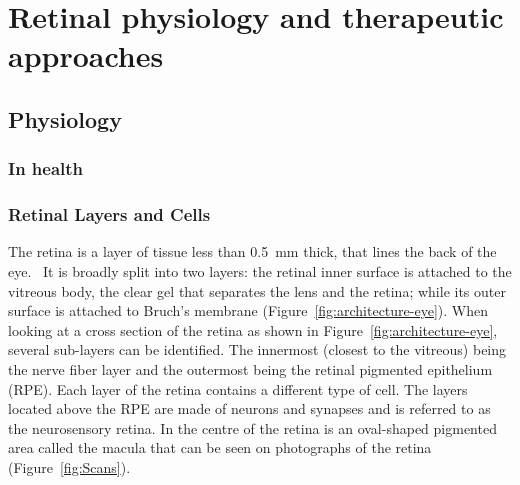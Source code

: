 \documentclass[12pt,a4paper]{journal}
\begin{document}
\section*{Retinal physiology and therapeutic approaches}

\subsection*{Physiology}

\subsubsection*{In health}

\subsubsection*{Retinal Layers and Cells}

The retina is a layer of tissue less than \SI{0.5}{\mm} thick, that lines the back of the eye.~\cite{Gupta_2015}
It is broadly split into two layers: the retinal inner surface is attached to the vitreous body, the clear gel that separates the lens and the retina; while its outer surface is attached to Bruch's membrane (Figure~\ref{fig:architecture-eye}).
When looking at a cross section of the retina as shown in Figure~\ref{fig:architecture-eye}, several sub-layers can be identified. The innermost (closest to the vitreous) being the nerve fiber layer and the outermost being the retinal pigmented epithelium (RPE).
Each layer of the retina contains a different type of cell.
The layers located above the RPE are made of neurons and synapses and is referred to as the neurosensory retina.
In the centre of the retina is an oval-shaped pigmented area called the macula that can be seen on photographs of the retina (Figure~\ref{fig:Scans}).
\end{document}
